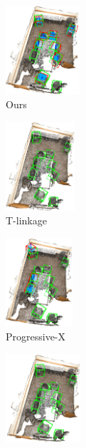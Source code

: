 \begin{figure}[ht]
          
          \begin{subfigure}{0.18\textwidth}
            \centering
            \includegraphics[height=3.3cm]{images/scan2cad-cad-ours.png}
              \caption{Ours}
              \label{fig:scan2cad_cad-result}
          \end{subfigure}
          \begin{subfigure}{0.18\textwidth}
            \centering
            \includegraphics[height=3.3cm]{images/scan2cad-cad-tlinkage.png}
              \caption{T-linkage\cite{magri2014t}}
              \label{fig:scan2cad_cad-tlinkage}
          \end{subfigure}
          \begin{subfigure}{0.19\textwidth}
            \centering
            \includegraphics[height=3.3cm]{images/scan2cad-cad-progx.png}
              \caption{Progressive-X\cite{zhao2021progressive}}
              \label{fig:scan2cad_cad-prox}
          \end{subfigure}
          \begin{subfigure}{0.17\textwidth}
            \centering
            \includegraphics[height=3.3cm]{images/scan2cad-cad-consac.png}

\end{subfigure}
\end{figure}
